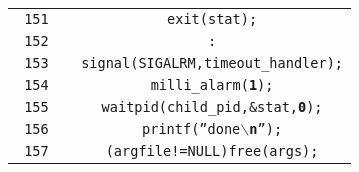 \documentclass[a4paper,landscape]{article}
\begin{document}
\begin{longtable}{NC}
\texttt{ 151 }&\mbox{\texttt{ \hspace{3ex}\hspace{3ex}\hspace{3ex}\hspace{3ex}\hspace{3ex}exit(stat);}}\\
\texttt{ 152 }&\mbox{\texttt{ \hspace{3ex}\hspace{3ex}\hspace{3ex}:}}\\
\texttt{ 153 }&\mbox{\texttt{ \hspace{3ex}\hspace{3ex}\hspace{3ex}\hspace{3ex}\hspace{3ex}signal(SIGALRM,timeout\_handler);}}\\
\texttt{ 154 }&\mbox{\texttt{ \hspace{3ex}\hspace{3ex}\hspace{3ex}\hspace{3ex}\hspace{3ex}milli\_alarm({\color[HTML]{811F24}\textbf{1}});}}\\
\texttt{ 155 }&\mbox{\texttt{ \hspace{3ex}\hspace{3ex}\hspace{3ex}\hspace{3ex}\hspace{3ex}waitpid(child\_pid,\&stat,{\color[HTML]{811F24}\textbf{0}});}}\\
\texttt{ 156 }&\mbox{\texttt{ \hspace{3ex}\hspace{3ex}\hspace{3ex}\hspace{3ex}\hspace{3ex}printf(''done{\color[HTML]{696969}\textbf{$\backslash$n}}'');}}\\
\texttt{ 157 }&\mbox{\texttt{ \hspace{3ex}\hspace{3ex}\hspace{3ex}\hspace{3ex}(argfile\hspace{1ex}!=\hspace{1ex}NULL)\hspace{1ex}free(args);}}\\

\end{longtable}
\end{document}
